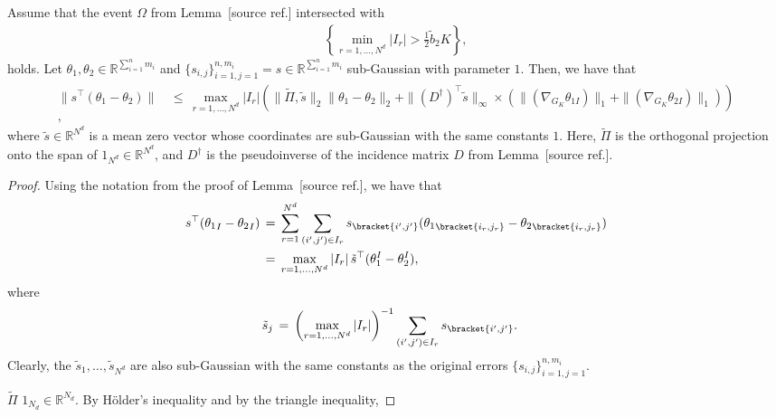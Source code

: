 \documentclass[twoside,11pt]{article}
\makeatletter
\newcommand{\discardlabel}[1]{}
\newcommand{\discardtwo}[2]{}
\newcommand{\legacyref}[1]{\textup{[source ref.]}}
\newcommand{\legacyeqref}[1]{\textup{[source equation]}}
\newenvironment{legacycomparison}{%
  \begingroup\color{legacygray}%
  \let\label\discardlabel
  \let\originallabel\discardlabel
  \let\ref\legacyref
  \let\pageref\legacyref
  \let\eqref\legacyeqref
  \let\cref\legacyref
  \let\Cref\legacyref
  \let\autoref\legacyref
  \let\aliasref\discardtwo
}{\endgroup}
\newcommand{\aliasref}[2]{%
  \@ifundefined{r@#2}{}{%
    \expandafter\let\csname r@#1\expandafter\endcsname\csname r@#2\endcsname}}
\makeatother
\begin{document}
\begin{legacycomparison}
\begin{lemma}
\label{lemma_17}    
 Assume that the event \(\Omega\) from Lemma~\ref{lemma_14} intersected with
\begin{align}
\left\{ \min_{r=1,\ldots,N^d} |I_r| > \frac{1}{2}\tilde b_2 K \right\},
\end{align}
holds. Let \(\theta_1, \theta_2 \in \mathbb{R}^{\sum_{i = 1}^n   m_i}\) and \(\{s_{i,j}\}_{i=1,j=1}^{n,m_i} = s \in \mathbb{R}^{\sum_{i = 1}^n   m_i}\) sub-Gaussian with parameter \(1\). 
Then, we have that
\begin{align}
\|s^{\top}(\theta_1 - \theta_2)\| &\,\leq\, \max_{r=1,\ldots,N^d} |I_r| \left( \|\tilde \Pi ,\tilde s\|_2\|\theta_1 - \theta_2\|_2 + \|(D^{\dag})^{\top} \tilde s\|_{\infty} \times \left( \|(\nabla_{G_K}\theta_{1I})\|_{1} + \|(\nabla_{G_K}\theta_{2I})\|_{1} \right) \right) \nonumber \\, \label{eq:lemma17_result}
\end{align}
where \(\tilde s \in \mathbb{R}^{N^d}\) is a mean zero vector whose coordinates are sub-Gaussian with the same constants \(1\). Here, \(\tilde \Pi\) is the orthogonal projection onto the span of \(1_{N^d} \in \mathbb{R}^{N^d}\), and \(D^{\dag}\) is the pseudoinverse of the incidence matrix \(D\) from Lemma~\ref{lemma_15}.
\end{lemma}


\begin{proof} Using the notation from the proof of Lemma~\ref{lemma_15}, we have that
\begin{align}
s^{\top}({\theta_1}_I - {\theta_2}_I) &\,=\, \sum_{r=1}^{N^d} \sum_{(i',j') \in I_r} s_{\bracket{i',j'}}({\theta_{1}}_{\bracket{i_r,j_r}} - {\theta_{2}}_{\bracket{i_r,j_r}}) \nonumber \\
&\,=\, \max_{r=1,\ldots,N^d} \left|I_r\right| {\tilde s}^{\top}(\theta_{1}^I - \theta_{2}^I),
\end{align}
where
\begin{align}
\tilde s_j &\,=\, \left( \max_{r=1,\ldots,N^d} |I_r| \right)^{-1} \sum_{(i',j') \in I_r} s_{\bracket{i',j'}}.
\end{align}
Clearly, the \(\tilde s_1, \ldots, \tilde s_{N^d}\) are also sub-Gaussian with the same constants as the original errors \(\{s_{i,j}\}_{i=1,j=1}^{n,m_i}\).


 $\tilde \Pi$  $1_{N_d} \in \mathbb{R}^{N_d}$.  By Hölder's inequality and by the triangle inequality,


\end{proof}
\end{legacycomparison}
\end{document}
